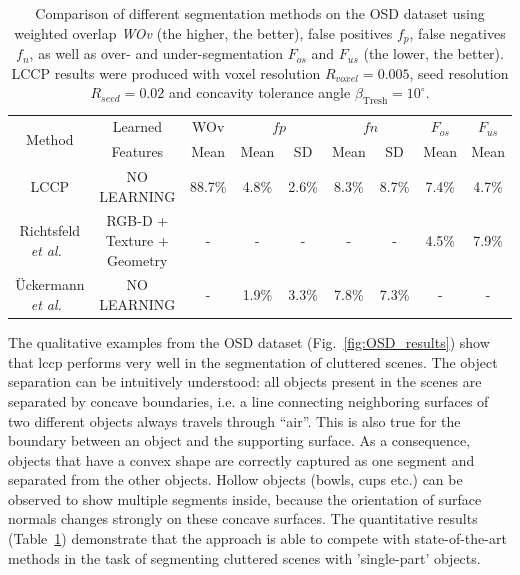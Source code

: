  \begin{table}[!ht]
   \centering
    \begin{tabular}{c||c||c||cc||cc||c||c}
    \multirow{2}{*}{Method} & Learned & WOv     & \multicolumn{2}{c||}{$fp$} & \multicolumn{2}{c||}{$fn$} & $F_{os}$ & $F_{us}$ \\ \cline{3-9}
    ~                       & Features & Mean   & Mean  & SD     & Mean  & SD    & Mean   & Mean   \\ \hline\hline
    LCCP            &  NO LEARNING & 88.7\% &  4.8\% & 2.6\%  & 8.3\% & 8.7\% & 7.4\%  & 4.7\%  \\ \hline
    Richtsfeld \textit{et al.}~\cite{Richtsfeld:IROS12}  & RGB-D + Texture + Geometry & -      & -          & -      & -     & -     & 4.5\%  & 7.9\%  \\ \hline
    {\"U}ckermann \textit{et al.}~\cite{Ritter2012} & NO LEARNING & -      & 1.9\% & 3.3\%  & 7.8\% & 7.3\% & -      & -      \\ \hline
    \end{tabular}
    \caption{Comparison of different segmentation methods on the OSD dataset using weighted overlap \textit{WOv} (the higher, the better), false positives \textit{$f_p$}, false negatives \textit{$f_n$}, as well as over- and under-segmentation \textit{$F_{os}$} and \textit{$F_{us}$} (the lower, the better). LCCP results were produced with voxel resolution $R_{voxel} = 0.005$, seed resolution $R_{seed} = 0.02$ and concavity tolerance angle $\beta_\text{Tresh}=10^\circ$.}
    \label{tab:res_stat}
\end{table}

The qualitative examples from the OSD dataset (Fig.~\ref{fig:OSD_results}) show that \gls{lccp} performs very well in the segmentation of cluttered scenes. The object separation can be intuitively understood: all objects present in the scenes are separated by concave boundaries, i.e. a line connecting neighboring surfaces of two different objects always travels through ``air''. This is also true for the boundary between an object and the supporting surface. As a consequence, objects that have a convex shape are correctly captured as one segment and separated from the other objects. Hollow objects (bowls, cups etc.) can be observed to show multiple segments inside, because the orientation of surface normals changes strongly on these concave surfaces. The quantitative results (Table~\ref{tab:res_stat}) demonstrate that the approach is able to compete with state-of-the-art methods in the task of segmenting cluttered scenes with 'single-part' objects. 

